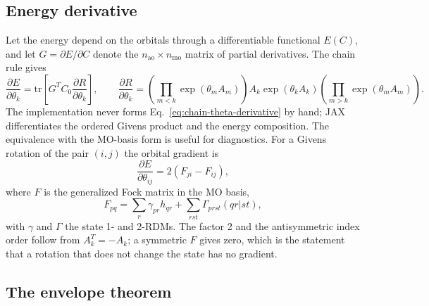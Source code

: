 \subsection{Energy derivative}

Let the energy depend on the orbitals through a differentiable
functional $E(C)$, and let $G=\partial E/\partial C$ denote the
$n_{\mathrm{ao}}\times n_{\mathrm{mo}}$ matrix of partial
derivatives.  The chain rule gives
\begin{equation}
  \frac{\partial E}{\partial\theta_k}
  = \mathrm{tr}\!\left[
      G^{T} C_0 \frac{\partial R}{\partial\theta_k}
    \right],
  \qquad
  \frac{\partial R}{\partial\theta_k}
  = \left(\prod_{m<k}\exp(\theta_m A_m)\right)
    A_k \exp(\theta_k A_k)
    \left(\prod_{m>k}\exp(\theta_m A_m)\right).
  \label{eq:chain-theta-derivative}
\end{equation}
The implementation never forms Eq.~\eqref{eq:chain-theta-derivative}
by hand; JAX differentiates the ordered Givens product and the energy
composition.  The equivalence with the MO-basis form is useful for
diagnostics.  For a Givens rotation of the pair $(i,j)$ the orbital
gradient is
\begin{equation}
  \frac{\partial E}{\partial\theta_{ij}}
  = 2\left(F_{ji}-F_{ij}\right),
  \label{eq:chain-orbital-gradient}
\end{equation}
where $F$ is the generalized Fock matrix in the MO basis,
\begin{equation}
  F_{pq} = \sum_r \gamma_{pr}h_{qr}
         + \sum_{rst}\Gamma_{prst}(qr|st),
  \label{eq:chain-generalized-fock}
\end{equation}
with $\gamma$ and $\Gamma$ the state 1- and 2-RDMs.  The factor 2 and
the antisymmetric index order follow from $A_k^{T}=-A_k$; a symmetric
$F$ gives zero, which is the statement that a rotation that does not
change the state has no gradient.

\subsection{The envelope theorem}

